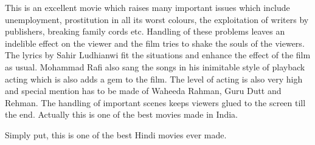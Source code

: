 \documentclass{article}
\begin{document}
This is an excellent movie which raises many important issues which include unemployment, prostitution in all its worst colours, the exploitation of writers by publishers, breaking family cords etc. Handling of these problems leaves an indelible effect on the viewer and the film tries to shake the souls of the viewers. The lyrics by Sahir Ludhianwi fit the situations and enhance the effect of the film as usual. Mohammad Rafi also sang the songs in his inimitable style of playback acting which is also adds a gem to the film. The level of acting is also very high and special mention has to be made of Waheeda Rahman, Guru Dutt and Rehman. The handling of important scenes keeps viewers glued to the screen till the end. Actually this is one of the best movies made in India. 


Simply put, this is one of the best Hindi movies ever made.
\end{document}
